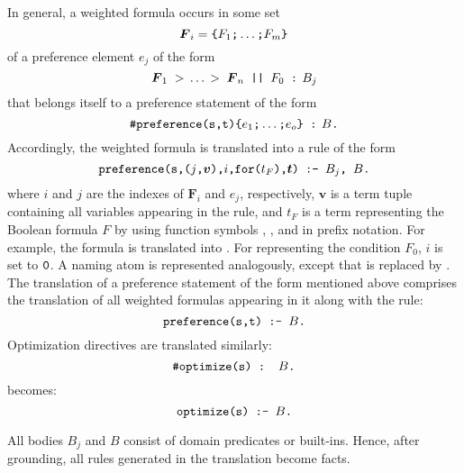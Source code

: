In general, a weighted formula 
occurs in some set
\[\boldsymbol{F}_i=\texttt{\{}F_1\texttt{;}\dots\texttt{;}F_m\texttt{\}}\]
of a preference element $e_j$ of the form 
\[\boldsymbol{F}_1\;>\,\dots\,>\;\boldsymbol{F}_n\texttt{ || }F_0\texttt{ : }\!\!\!\! B_j\]
that belongs itself to a preference statement  of the form
\[\texttt{\#preference(s,t)\{}e_1\texttt{;}\dots\texttt{;}e_o\texttt{\} : }\!\!\!\!B\texttt{.}\]
Accordingly, the weighted formula is translated into a rule of the form
\[\texttt{preference(s,(}j\texttt{,}\boldsymbol{v}\texttt{),}i\texttt{,for(}t_F\texttt{),}\boldsymbol{t}\texttt{) :- }B_j\texttt{, }B\texttt{.}\]
where $i$ and $j$ are the indexes of $\boldsymbol{F}_i$ and $e_j$, respectively, 
$\boldsymbol{v}$ is a term tuple containing all variables appearing in the rule, 
and ${t}_F$ is a term representing the Boolean formula $F$ 
by using function symbols , , and  in prefix notation.
For example, 
the formula  is translated into . 
%
For representing the condition $F_0$, $i$ is set to $\texttt{0}$.
%
A naming atom  is represented analogously,
except that  is replaced by .
%
The translation of a preference statement of the form mentioned above 
comprises the translation of all weighted formulas appearing in it
along with the rule:
\[\texttt{preference(s,t) :- }B\texttt{.}\]
Optimization directives are translated similarly:
\[\texttt{\#optimize(s) : }B\texttt{.}\]
becomes:
\[\texttt{optimize(s) :- }B\texttt{.}\]

\begin{note}
All bodies $B_j$ and $B$ consist of domain predicates or built-ins. 
Hence, after grounding, all rules generated in the translation become facts.
\end{note}

